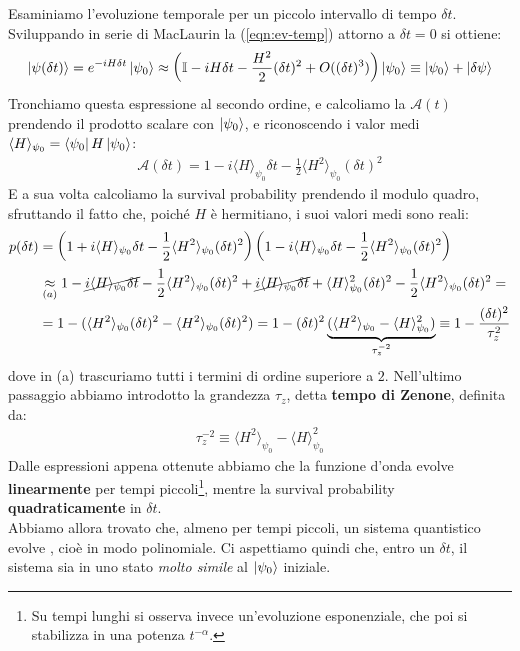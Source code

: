 \documentclass[../../InformazioneQuantistica.tex]{subfiles}
\begin{document}
Esaminiamo l'evoluzione temporale per un piccolo intervallo di tempo $\delta t$. Sviluppando in serie di MacLaurin la (\ref{eqn:ev-temp}) attorno a $\delta t=0$ si ottiene:
\begin{align*}
\Ket{\psi(\delta t)} = e^{-iH\delta t} \Ket{\psi_0} \approx \left(\mathbb{I} - iH\delta t -\frac{H^2}{2} (\delta t)^2 + O((\delta t)^3) \right) \Ket{\psi_0} \equiv \Ket{\psi_0} + \Ket{\delta \psi}
\end{align*}
Tronchiamo questa espressione al secondo ordine, e calcoliamo la  $\mathcal{A}(t)$ prendendo il prodotto scalare con $\Ket{\psi_0}$, e riconoscendo i valor medi $\langle H \rangle_{\psi_0}=\Bra{\psi_0}H\Ket{\psi_0}$:
\begin{align}
\mathcal{A}(\delta t) = 1 - i\langle H \rangle_{\psi_0} \delta t- \frac{1}{2}\langle H^2 \rangle_{\psi_0} (\delta t)^2
\label{eqn:survival-amplitude-small}
\end{align}
E a sua volta calcoliamo la survival probability prendendo il modulo quadro, sfruttando il fatto che, poiché $H$ è hermitiano, i suoi valori medi sono reali:
\begin{align}\nonumber
p(\delta t) &= \left(1 + i\langle H \rangle_{\psi_0} \delta t- \frac{1}{2}\langle H^2\rangle_{\psi_0} (\delta t)^2 \right) \left(1-i\langle H \rangle_{\psi_0}\delta t - \frac{1}{2}\langle H^2\rangle_{\psi_0}(\delta t)^2\right) \\ \nonumber
&\underset{(a)}{\approx} 1 - \cancel{i\langle H \rangle_{\psi_0} \delta t}- \frac{1}{2}\langle H^2\rangle_{\psi_0} (\delta t)^2 + \cancel{i\langle H \rangle_{\psi_0} \delta t} + \langle H\rangle_{\psi_0}^2 (\delta t)^2 - \frac{1}{2}\langle H^2\rangle_{\psi_0} (\delta t)^2=\\
&= 1-(\langle H^2\rangle_{\psi_0} (\delta t)^2 - \langle H^2\rangle_{\psi_0}(\delta t)^2)
= 1-(\delta t)^2 \underbrace{(\langle H^2\rangle_{\psi_0}-\langle H\rangle_{\psi_0}^2)}_{\tau_z^{-2}} \equiv 1-\frac{(\delta t)^2}{\tau^2_z} 
\label{eqn:p-tau}
\end{align}
dove in (a) trascuriamo tutti i termini di ordine superiore a $2$. Nell'ultimo passaggio abbiamo introdotto la grandezza $\tau_z$, detta \textbf{tempo di Zenone}, definita da:
\begin{align}
\tau_z^{-2} \equiv \langle H^2\rangle_{\psi_0} - \langle H \rangle_{\psi_0}^2
\label{eqn:zeno-time}
\end{align}
Dalle espressioni appena ottenute abbiamo che la funzione d'onda evolve \textbf{linearmente} per tempi piccoli\footnote{Su tempi lunghi si osserva invece un'evoluzione esponenziale, che poi si stabilizza in una potenza $t^{-\alpha}$.}, mentre la survival probability \textbf{quadraticamente} in $\delta t$.\\
Abbiamo allora trovato che, almeno per tempi piccoli, un sistema quantistico evolve , cioè in modo polinomiale. Ci aspettiamo quindi che, entro un $\delta t$, il sistema sia in uno stato \textit{molto simile} al $\Ket{\psi_0}$ iniziale.\\
\end{document}
